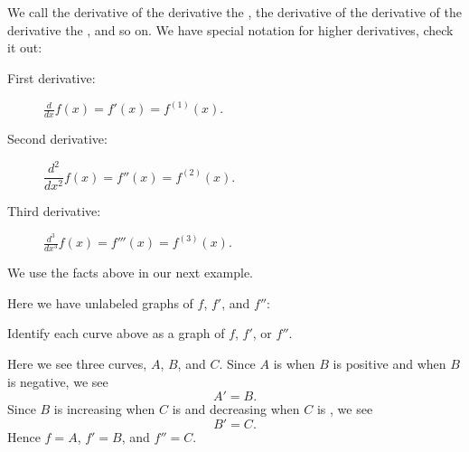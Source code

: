 \documentclass{ximera}
\begin{document}
We call the derivative of the derivative the , the derivative of the derivative of the derivative the
, and so on. We have special notation for
higher derivatives, check it out:
\begin{description}
\item[First derivative:] $\frac{d}{dx} f(x) = f'(x) = f^{(1)}(x)$.
\item[Second derivative:] $\dfrac{d^2}{dx^2} f(x) = f''(x) = f^{(2)}(x)$.
\item[Third derivative:] $\frac{d^3}{dx^3} f(x) = f'''(x) = f^{(3)}(x)$.
\end{description}

We use the facts above in our next example.

\begin{example}
  Here we have unlabeled graphs of $f$, $f'$, and $f''$:
  \begin{image}
  \end{image}
  Identify each curve above as a graph of $f$, $f'$, or $f''$.
  \begin{explanation} 
    Here we see three curves, $A$, $B$, and $C$. Since $A$ is
     when $B$ is
    positive and
    when $B$ is negative, we see
    \[
    A'=B.
    \]
    Since $B$ is increasing when $C$ is
     and decreasing when $C$ is
    , we see
    \[
    B'=C.
    \]
    Hence $f=A$, $f'=B$, and $f''=C$.
  \end{explanation}
\end{example}
\end{document}
